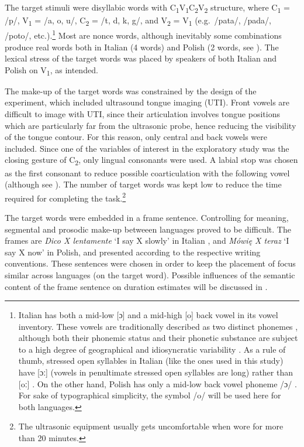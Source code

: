 \documentclass[12pt,]{article}
\let\rmarkdownfootnote\footnote%
\def\footnote{\protect\rmarkdownfootnote}
\begin{document}
The target stimuli were disyllabic words with
C\textsubscript{1}V\textsubscript{1}C\textsubscript{2}V\textsubscript{2}
structure, where C\textsubscript{1} = /p/, V\textsubscript{1} = /a, o,
u/, C\textsubscript{2} = /t, d, k, g/, and V\textsubscript{2} =
V\textsubscript{1} (e.g.~/pata/, /pada/, /poto/,
etc.).\footnote{Italian has both a mid-low [ɔ] and a mid-high [o] back vowel in its vowel inventory. These vowels are traditionally described as two distinct phonemes \citep{kramer2009}, although both their phonemic status and their phonetic substance are subject to a high degree of geographical and idiosyncratic variability \citep{renwick2016}. As a rule of thumb, stressed open syllables in Italian (like the ones used in this study) have [ɔː] (vowels in penultimate stressed open syllables are long) rather than [oː] \citep{renwick2016}. On the other hand, Polish has only a mid-low back vowel phoneme /ɔ/ \citep{gussmann2007}. For sake of typographical simplicity, the symbol /o/ will be used here for both languages.}
Most are nonce words, although inevitably some combinations produce real
words both in Italian (4 words) and Polish (2 words, see
). The lexical stress of the target words was placed by
speakers of both Italian and Polish on V\textsubscript{1}, as intended.

The make-up of the target words was constrained by the design of the
experiment, which included ultrasound tongue imaging (UTI). Front vowels
are difficult to image with UTI, since their articulation involves
tongue positions which are particularly far from the ultrasonic probe,
hence reducing the visibility of the tongue contour. For this reason,
only central and back vowels were included. Since one of the variables
of interest in the exploratory study was the closing gesture of
C\textsubscript{2}, only lingual consonants were used. A labial stop was
chosen as the first consonant to reduce possible coarticulation with the
following vowel (although see \citealt{vazquez-alvarez2007}). The number
of target words was kept low to reduce the time required for completing
the
task.\footnote{The ultrasonic equipment usually gets uncomfortable when wore for more than 20 minutes.
}

The target words were embedded in a frame sentence. Controlling for
meaning, segmental and prosodic make-up betweeen languages proved to be
difficult. The frames are \emph{Dico X lentamente} `I say X slowly' in
Italian \citep[following][]{hajek2008}, and \emph{Mówię X teraz} `I say
X now' in Polish, and presented according to the respective writing
conventions. These sentences were chosen in order to keep the placement
of focus similar across languages (on the target word). Possible
influences of the semantic content of the frame sentence on duration
estimates will be discussed in .
\end{document}
